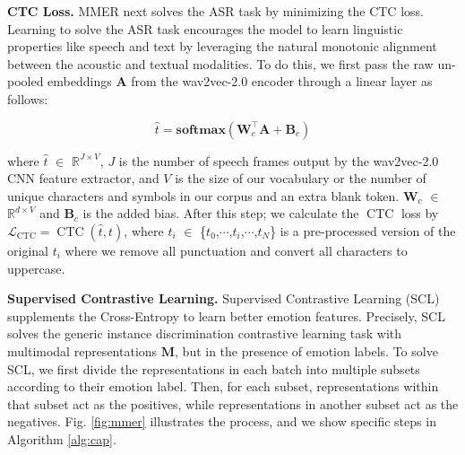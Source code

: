 \documentclass{INTERSPEECH2023}
\begin{document}
{\noindent \textbf{CTC Loss.}} MMER next solves the ASR task by minimizing the CTC loss. Learning to solve the ASR task encourages the model to learn linguistic properties like speech and text by leveraging the natural monotonic alignment between the acoustic and textual modalities. To do this, we first pass the raw un-pooled embeddings $\mathbf{A}$ from the wav2vec-2.0 encoder through a linear layer as follows:

\begin{equation}
\hat{t} = \mathbf{softmax}\left(\mathbf{W}_{c}^{\top}\mathbf{A} + \mathbf{B}_{c}\right)
\end{equation}

where $\hat{t}$ $\in$ $\mathbb{R}^{J \times V}$, $J$ is the number of speech frames output by the wav2vec-2.0 CNN feature extractor, and $V$ is the size of our vocabulary or the number of unique characters and symbols in our corpus and an extra blank token. $\mathbf{W}_{c}$ $\in$ $\mathbb{R}^{d \times V}$ and $\mathbf{B}_{c}$ is the added bias. After this step; we calculate the $\operatorname{CTC}$ loss by $\mathcal{L}_{\mathrm{CTC}}=\operatorname{CTC}(\hat{t},t)$, where $t_i$ $\in$ \{$t_0$,$\cdots$,$t_i$,$\cdots$,$t_N$\} is a pre-processed version of the original $t_i$ where we remove all punctuation and convert all characters to uppercase.
\vspace{1mm}

{\noindent \textbf{Supervised Contrastive Learning.}} Supervised Contrastive Learning (SCL) \cite{khosla2020supervised} supplements the Cross-Entropy to learn better emotion features. Precisely, SCL solves the generic instance discrimination contrastive learning task with multimodal representations $\mathbf{M}$, but in the presence of emotion labels. To solve SCL, we first divide the representations in each batch into multiple subsets according to their emotion label. Then, for each subset, representations within that subset act as the positives, while representations in another subset act as the negatives. Fig. \ref{fig:mmer} illustrates the process, and we show specific steps in Algorithm \ref{alg:cap}.
\vspace{1mm}
\end{document}
